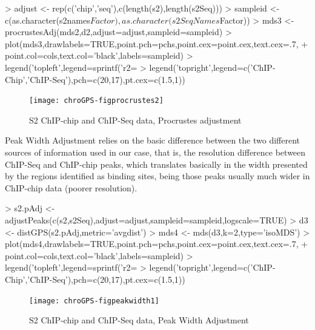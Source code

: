 \documentclass[a4paper,12pt,nogin]{article}
\begin{document}
\footnotesize
 
\begin{Schunk}
\begin{Sinput}
> adjust <- rep(c('chip','seq'),c(length(s2),length(s2Seq)))
> sampleid <- c(as.character(s2names$Factor),as.character(s2SeqNames$Factor))
> mds3 <- procrustesAdj(mds2,d2,adjust=adjust,sampleid=sampleid)
> plot(mds3,drawlabels=TRUE,point.pch=pchs,point.cex=point.cex,text.cex=.7,
+ point.col=cols,text.col='black',labels=sampleid)
> legend('topleft',legend=sprintf('r2=%
> legend('topright',legend=c('ChIP-Chip','ChIP-Seq'),pch=c(20,17),pt.cex=c(1.5,1))
\end{Sinput}
\end{Schunk}
 
\normalsize
 
\begin{figure}
\begin{center}
\texttt{[image: chroGPS-figprocrustes2]}
\end{center}
\caption{S2 ChIP-chip and ChIP-Seq data, Procrustes adjustment}
\label{fig:procrustes2}
\end{figure}
 
Peak Width Adjustment relies on the basic difference between the two
different sources of information used in our case, that is, the
resolution difference between ChIP-Seq and ChIP-chip peaks, which
translates basically in the width presented by the regions identified
as binding sites, being those peaks usually much wider in ChIP-chip
data (poorer resolution).
 
\footnotesize
 
\begin{Schunk}
\begin{Sinput}
> s2.pAdj <- adjustPeaks(c(s2,s2Seq),adjust=adjust,sampleid=sampleid,logscale=TRUE)
> d3 <- distGPS(s2.pAdj,metric='avgdist')
> mds4 <- mds(d3,k=2,type='isoMDS')
> plot(mds4,drawlabels=TRUE,point.pch=pchs,point.cex=point.cex,text.cex=.7,
+ point.col=cols,text.col='black',labels=sampleid)
> legend('topleft',legend=sprintf('r2=%
> legend('topright',legend=c('ChIP-Chip','ChIP-Seq'),pch=c(20,17),pt.cex=c(1.5,1))
\end{Sinput}
\end{Schunk}
 
\normalsize
 
\begin{figure}
\begin{center}
\texttt{[image: chroGPS-figpeakwidth1]}
\end{center}
\caption{S2 ChIP-chip and ChIP-Seq data, Peak Width Adjustment}
\label{fig:peakwidth1}
\end{figure}
\end{document}
